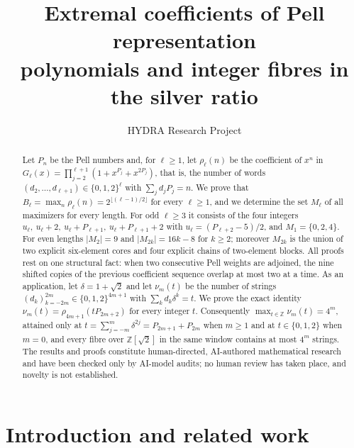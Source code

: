 \documentclass[11pt]{amsart}
\title[Pell representation polynomials and silver-ratio fibres]{Extremal coefficients of Pell representation\\ polynomials and integer fibres in the silver ratio}
\author[HYDRA Research Project]{HYDRA Research Project}
\theoremstyle{definition}
\theoremstyle{remark}
\theoremstyle{plain}
\numberwithin{equation}{section}
\begin{document}
\begin{abstract}
Let $P_n$ be the Pell numbers and, for $\ell\ge1$, let $\rho_\ell(n)$ be the coefficient of $x^n$
in $G_\ell(x)=\prod_{j=2}^{\ell+1}(1+x^{P_j}+x^{2P_j})$, that is, the number of words
$(d_2,\dots,d_{\ell+1})\in\{0,1,2\}^\ell$ with $\sum_j d_jP_j=n$. We prove that
$B_\ell=\max_n\rho_\ell(n)=2^{\lfloor(\ell-1)/2\rfloor}$ for every $\ell\ge1$, and we determine the
set $M_\ell$ of all maximizers for every length. For odd $\ell\ge3$ it consists of the four integers
$u_\ell,\ u_\ell+2,\ u_\ell+P_{\ell+1},\ u_\ell+P_{\ell+1}+2$ with $u_\ell=(P_{\ell+2}-5)/2$, and
$M_1=\{0,2,4\}$. For even lengths $|M_2|=9$ and $|M_{2k}|=16k-8$ for $k\ge2$; moreover $M_{2k}$ is
the union of two explicit six-element cores and four explicit chains of two-element blocks. All
proofs rest on one structural fact: when two consecutive Pell weights are adjoined, the nine shifted
copies of the previous coefficient sequence overlap at most two at a time. As an application, let
$\delta=1+\sqrt2$ and let $\nu_m(t)$ be the number of strings
$(d_k)_{k=-2m}^{2m}\in\{0,1,2\}^{4m+1}$ with $\sum_kd_k\delta^k=t$. We prove the exact identity
$\nu_m(t)=\rho_{4m+1}(tP_{2m+2})$ for every integer $t$. Consequently
$\max_{t\in\mathbb Z}\nu_m(t)=4^m$, attained only at $t=\sum_{j=-m}^{m}\delta^{2j}=P_{2m+1}+P_{2m}$
when $m\ge1$ and at $t\in\{0,1,2\}$ when $m=0$, and every fibre over $\mathbb Z[\sqrt2]$ in the same
window contains at most $4^m$ strings. The results and proofs constitute human-directed, AI-authored mathematical research
and have been checked only by AI-model audits; no human review has taken place, and
novelty is not established.
\end{abstract}

\maketitle

\section{Introduction and related work}\label{sec:intro}
\end{document}
